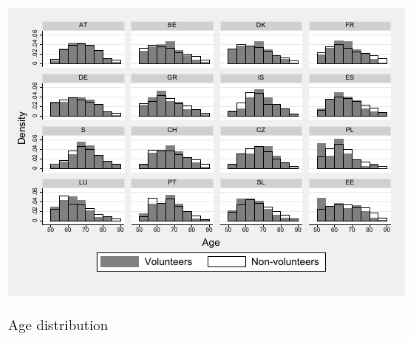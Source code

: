 \documentclass[10pt, letterpaper]{article}
\begin{document}
\begin{spacing}{1.4}
\begin{spacing}{.9}
 

\begin{figure}[H]
 \includegraphics[height=3in]{hist_age.pdf}
 \centering
 \label{fig:hist_age}
\caption{Age distribution}
\end{figure}



\end{spacing}
\end{spacing}
\end{document}
